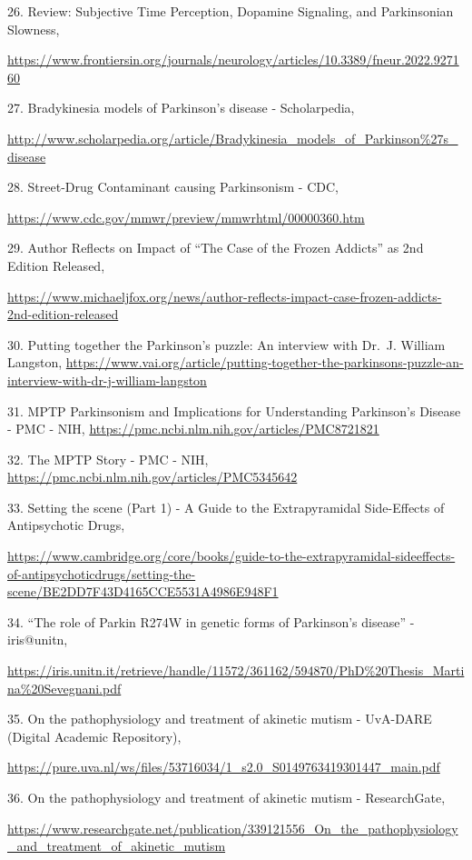 26. Review: Subjective Time Perception, Dopamine Signaling, and Parkinsonian Slowness,

\url{https://www.frontiersin.org/journals/neurology/articles/10.3389/fneur.2022.927160}

27. Bradykinesia models of Parkinson's disease - Scholarpedia,

\url{http://www.scholarpedia.org/article/Bradykinesia_models_of_Parkinson\%27s_disease}

28. Street-Drug Contaminant causing Parkinsonism - CDC,

\url{https://www.cdc.gov/mmwr/preview/mmwrhtml/00000360.htm}

29. Author Reflects on Impact of ``The Case of the Frozen Addicts'' as 2nd Edition Released,

\url{https://www.michaeljfox.org/news/author-reflects-impact-case-frozen-addicts-2nd-edition-released}

30. Putting together the Parkinson's puzzle: An interview with Dr.~J. William Langston, \url{https://www.vai.org/article/putting-together-the-parkinsons-puzzle-an-interview-with-dr-j-william-langston}

31. MPTP Parkinsonism and Implications for Understanding Parkinson's Disease - PMC - NIH, \url{https://pmc.ncbi.nlm.nih.gov/articles/PMC8721821}

32. The MPTP Story - PMC - NIH, \url{https://pmc.ncbi.nlm.nih.gov/articles/PMC5345642}

33. Setting the scene (Part 1) - A Guide to the Extrapyramidal Side-Effects of Antipsychotic Drugs,

\url{https://www.cambridge.org/core/books/guide-to-the-extrapyramidal-sideeffects-of-antipsychoticdrugs/setting-the-scene/BE2DD7F43D4165CCE5531A4986E948F1}

34. ``The role of Parkin R274W in genetic forms of Parkinson's disease'' - iris@unitn,

\url{https://iris.unitn.it/retrieve/handle/11572/361162/594870/PhD\%20Thesis_Martina\%20Sevegnani.pdf}

35. On the pathophysiology and treatment of akinetic mutism - UvA-DARE (Digital Academic Repository),

\url{https://pure.uva.nl/ws/files/53716034/1_s2.0_S0149763419301447_main.pdf}

36. On the pathophysiology and treatment of akinetic mutism - ResearchGate,

\url{https://www.researchgate.net/publication/339121556_On_the_pathophysiology_and_treatment_of_akinetic_mutism}

